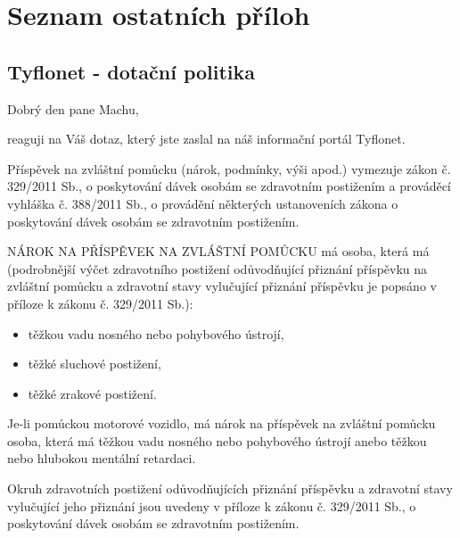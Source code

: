 \documentclass[thesis=M,czech]{FITthesis}[2012/06/26]
\begin{document}
\chapter{Seznam ostatních příloh}
\section{Tyflonet - dotační politika}\label{att:tyflonet}
Dobrý den pane Machu,

reaguji na Váš dotaz, který jste zaslal na náš informační portál Tyflonet.

Příspěvek na zvláštní pomůcku (nárok, podmínky, výši apod.) vymezuje zákon
č. 329/2011 Sb., o poskytování dávek osobám se zdravotním postižením a
prováděcí vyhláška č. 388/2011 Sb., o provádění některých ustanoveních
zákona o poskytování dávek osobám se zdravotním postižením.

NÁROK NA PŘÍSPĚVEK NA ZVLÁŠTNÍ POMŮCKU má osoba, která má (podrobnější výčet
zdravotního postižení odůvodňující přiznání příspěvku na zvláštní pomůcku a
zdravotní stavy vylučující přiznání příspěvku je popsáno v příloze k zákonu
č. 329/2011 Sb.):
\begin{itemize}
  \item těžkou vadu nosného nebo pohybového ústrojí,
  \item těžké sluchové postižení,
  \item těžké zrakové postižení.
\end{itemize}
Je-li pomůckou motorové vozidlo, má nárok na příspěvek na zvláštní pomůcku
osoba, která má těžkou vadu nosného nebo pohybového ústrojí anebo těžkou
nebo hlubokou mentální retardaci.

Okruh zdravotních postižení odůvodňujících přiznání příspěvku a zdravotní
stavy vylučující jeho přiznání jsou uvedeny v příloze k zákonu č. 329/2011
Sb., o poskytování dávek osobám se zdravotním postižením.
\end{document}
